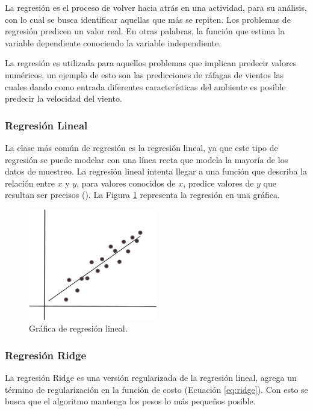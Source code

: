 La regresión es el proceso de volver hacia atrás en una actividad, para su análisis, con lo cual se busca identificar aquellas que más se repiten. Los problemas de regresión predicen un valor real. En otras palabras, la función que estima la variable dependiente conociendo la variable independiente.

La regresión es utilizada para aquellos problemas que implican predecir valores numéricos, un ejemplo de esto son las predicciones de ráfagas de vientos las cuales dando como entrada diferentes características del ambiente es posible predecir la velocidad del viento.

\subsubsection{Regresión Lineal}

La clase más común de regresión es la regresión lineal, ya que este tipo de regresión se puede modelar con una línea recta que modela la mayoría de los datos de muestreo. La regresión lineal intenta llegar a una función que describa la relación entre $x$ y $y$, para valores conocidos de $x$, predice valores de $y$ que resultan ser precisos (\cite{patterson2017deep}). La Figura \ref{fig:regresionLineal} representa la regresión en una gráfica.

\begin{figure}[H]
    \centering
    \includegraphics[width=0.5\textwidth]{MarcoTeorico/imgs/RegresionLineal.png}
    \caption{Gráfica de regresión lineal.}
    \label{fig:regresionLineal}
\end{figure}

\subsubsection{Regresión Ridge}

La regresión Ridge es una versión regularizada de la regresión lineal, agrega un término de regularización en la función de costo (Ecuación \ref{eq:ridge}). Con esto se busca que el algoritmo mantenga los pesos lo más pequeños posible.

